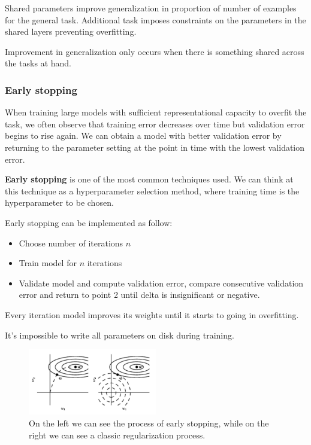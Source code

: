 Shared parameters improve generalization in proportion of number of examples for
the general task. Additional task imposes constraints on the parameters in the
shared layers preventing overfitting.
\begin{note}
    Improvement in generalization only occurs when there is something shared across
    the tasks at hand.
\end{note}
\subsubsection{Early stopping}
When training large models with sufficient representational capacity to overfit
the task, we often observe that training error decreases over time but validation
error begins to rise again. We can obtain a model with better validation error by
returning to the parameter setting at the point in time with the lowest validation
error.

\textbf{Early stopping} is one of the most common techniques used. We can think
at this technique as a hyperparameter selection method, where training time is
the hyperparameter to be chosen.

Early stopping can be implemented as follow:
\begin{itemize}
    \item Choose number of iterations $n$
    \item Train model for $n$ iterations
    \item Validate model and compute validation error, compare consecutive validation
          error and return to point 2 until delta is insignificant or negative.
\end{itemize}
Every iteration model improves its weights until it starts to going in overfitting.
\begin{note}
    It's impossible to write all parameters on disk during training.
\end{note}
\begin{figure}[!ht]
    \centering
    \includegraphics[width=0.5\textwidth]{img/early_stopping.png}
    \caption{On the left we can see the process of early stopping, while on the
        right we can see a classic regularization process.}
    \label{fig:earlystopping}
\end{figure}
